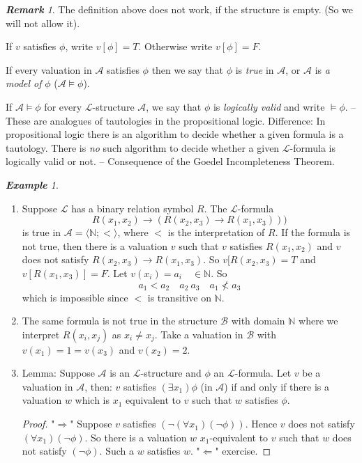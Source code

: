 \documentclass[a4paper,oneside,11pt,DIV=12,parskip=half]{scrartcl}
\newcommand{\N}{\mathbb N}
\newcommand{\LL}{\mathcal L}
\newcommand{\A}{\mathcal A}
\theoremstyle{plain}
\theoremstyle{definition}
\newtheorem{remark, definition}[theorem]{Remark and Definition.}
\newtheorem{lemma, definition}[theorem]{Lemma and Definition.}
\newtheorem{theorem, definition}[theorem]{Theorem and Definition.}
\theoremstyle{remark}
\newtheorem*{remark}{\textbf{Remark}}
\newtheorem*{example}{\textbf{Example}}
\newtheorem*{remark, example}{\textbf{Remark and Exercise}}
\begin{document}
\begin{remark}
The definition above does not work, if the structure is empty. (So we will not allow it).

If $v$ satisfies $\phi$, write $v[\phi] = T$. Otherwise write $v[\phi]=F$.

If every valuation in $\A$ satisfies $\phi$ then we say that $\phi$ is \emph{true} in $\A$, or $\A$ is \emph{a model of} $\phi$ ($\A \vDash \phi$).

If $\A \vDash \phi$ for every $\LL$-structure $\A$, we say that $\phi$ is \emph{logically valid} and write $\vDash \phi$.
-- These are analogues of tautologies in the propositional logic. Difference: In propositional logic there is an algorithm to decide whether a given formula is a tautology. There is \emph{no} such algorithm to decide whether a given $\LL$-formula is logically valid or not. -- Consequence of the Goedel Incompleteness Theorem.
\end{remark}

\begin{example}
\begin{enumerate}
    \item Suppose $\LL$ has a binary relation symbol $R$. The $\LL$-formula 
            \[ R(x_1,x_2) \rightarrow (R(x_2,x_3) \rightarrow R(x_1,x_3))) \]
        is true in $\A = \langle \N; < \rangle $, where $ < $ is the interpretation of $R$.
        If the formula is not true, then there is a valuation $v$ such that $v$ satisfies $R(x_1,x_2)$ and $v$ does not satisfy $R(x_2,x_3) \rightarrow R(x_1,x_3)$. So $v[R(x_2,x_3) = T$ and $v[R(x_1,x_3)]=F$. Let $v(x_i) = a_i \quad \in \N$. So 
            \[ a_1 < a_2 \quad a_2 \ a_3 \quad a_1 \not < a_3 \] 
        which is impossible since $<$ is transitive on $\N$.
    \item The same formula is not true in the structure $\mathcal{B}$ with domain     $\N$ where we interpret $R(x_i,x_j)$ as $x_i \neq x_j$. Take a valuation      in $\mathcal{B}$ with $v(x_1) = 1 = v(x_3)$ and $v(x_2) = 2$.
    \item Lemma: Suppose $\A$ is an $\LL$-structure and $\phi$ an $\LL$-formula. Let $v$ be a valuation in $\A$, then:
        $v$ satisfies $(\exists x_1) \phi $ (in $\A$) if and only if there is a valuation $w$ which is $x_1$ equivalent to $v$ such that $w$ satisfies $\phi$.
        \begin{proof}
        "$\Rightarrow$" Suppose $v$ satisfies $(\lnot ( \forall x_1) (\lnot \phi))$. Hence $v$ does not satisfy $(\forall x_1) (\lnot \phi)$. So there is a valuation $w$ $x_1$-equivalent to $v$ such that $w$ does not satisfy $(\lnot \phi)$. Such a $w$ satisfies $w$.
        "$\Leftarrow$" exercise.
        \end{proof}
\end{enumerate}
\end{example}
\end{document}
